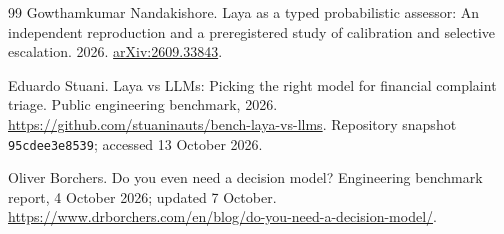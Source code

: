 \begin{thebibliography}{99}
Gowthamkumar Nandakishore.
Laya as a typed probabilistic assessor: An independent reproduction and a
preregistered study of calibration and selective escalation.
2026. \href{https://arxiv.org/abs/2609.33843}{arXiv:2609.33843}.

Eduardo Stuani.
Laya vs LLMs: Picking the right model for financial complaint triage.
Public engineering benchmark, 2026.
\url{https://github.com/stuaninauts/bench-laya-vs-llms}.
Repository snapshot \texttt{95cdee3e8539}; accessed 13 October 2026.

Oliver Borchers.
Do you even need a decision model?
Engineering benchmark report, 4 October 2026; updated 7 October.
\url{https://www.drborchers.com/en/blog/do-you-need-a-decision-model/}.
\end{thebibliography}
